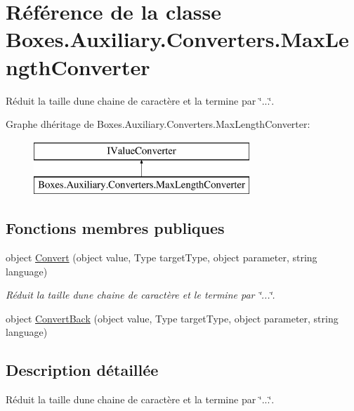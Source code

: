 \hypertarget{class_boxes_1_1_auxiliary_1_1_converters_1_1_max_length_converter}{}\section{Référence de la classe Boxes.\+Auxiliary.\+Converters.\+Max\+Length\+Converter}
\label{class_boxes_1_1_auxiliary_1_1_converters_1_1_max_length_converter}


Réduit la taille d\textquotesingle{}une chaine de caractère et la termine par \char`\"{}...\char`\"{}.  


Graphe d\textquotesingle{}héritage de Boxes.\+Auxiliary.\+Converters.\+Max\+Length\+Converter\+:\begin{figure}[H]
\begin{center}
\leavevmode
\includegraphics[height=2.000000cm]{class_boxes_1_1_auxiliary_1_1_converters_1_1_max_length_converter}
\end{center}
\end{figure}
\subsection*{Fonctions membres publiques}
\begin{DoxyCompactItemize}
\item 
object \hyperlink{class_boxes_1_1_auxiliary_1_1_converters_1_1_max_length_converter_aba2328d07c7b3ddc8f6585334f7f0e40}{Convert} (object value, Type target\+Type, object parameter, string language)
\begin{DoxyCompactList}\small\item\em Réduit la taille d\textquotesingle{}une chaine de caractère et le termine par \char`\"{}...\char`\"{}. \end{DoxyCompactList}\item 
object \hyperlink{class_boxes_1_1_auxiliary_1_1_converters_1_1_max_length_converter_aaaa2d222a5516a9d30e46829492aa5cc}{Convert\+Back} (object value, Type target\+Type, object parameter, string language)
\end{DoxyCompactItemize}


\subsection{Description détaillée}
Réduit la taille d\textquotesingle{}une chaine de caractère et la termine par \char`\"{}...\char`\"{}. 



